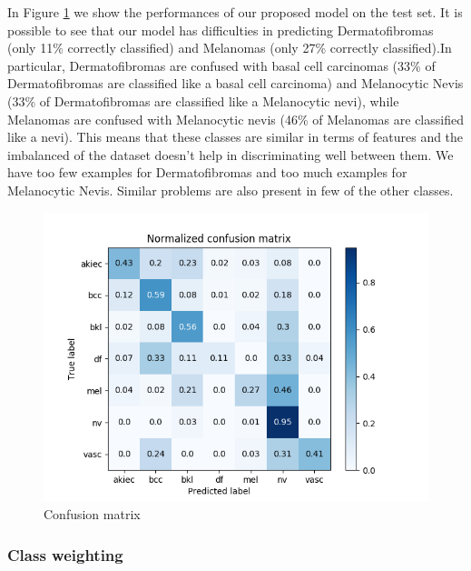 		In Figure \ref{fig:first-matrix} we show the performances of our proposed model on the test set. It is possible to see that our model has difficulties in predicting Dermatofibromas (only 11\% correctly classified) and Melanomas (only 27\% correctly classified).In particular, Dermatofibromas are confused with basal cell carcinomas (33\% of Dermatofibromas are classified like a basal cell carcinoma) and Melanocytic Nevis (33\% of Dermatofibromas are classified like a Melanocytic nevi), while Melanomas are confused with Melanocytic nevis (46\% of Melanomas are classified like a nevi). 
		This means that these classes are similar in terms of features and the imbalanced of the dataset doesn’t help in discriminating well between them. We have too few examples for Dermatofibromas and too much examples for Melanocytic Nevis. Similar problems are also present in few of the other classes.
		
		\begin{figure}[H]
			\centering
			\includegraphics[width=15cm]{images/firstMatrix.png}
			\caption{Confusion matrix}
			\label{fig:first-matrix}
		\end{figure}
		
	\subsubsection{Class weighting}
	
